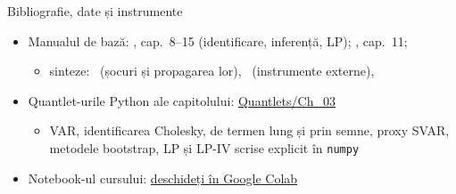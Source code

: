 \begin{frame}{Bibliografie, date și instrumente}
\itemsize{\small}
\begin{itemize}
    \item Manualul de bază: , cap.~8--15 (identificare, inferență, LP); , cap.~11; 
    \begin{itemize}
        \item sinteze: \ (șocuri și propagarea lor), \ (instrumente externe), 
    \end{itemize}
    \item Quantlet-urile Python ale capitolului: \href{https://github.com/danpele/Advanced-Time-Series/tree/main/Quantlets/Ch_03}{Quantlets/Ch\_03}
    \begin{itemize}
        \item VAR, identificarea Cholesky, de termen lung și prin semne, proxy SVAR, metodele bootstrap, LP și LP-IV scrise explicit în \texttt{numpy}
    \end{itemize}
    \item Notebook-ul cursului: \href{\colaburl{notebooks/EN/chapter3_lecture_notebook.ipynb}}{deschideți în Google Colab}
\end{itemize}
\end{frame}

